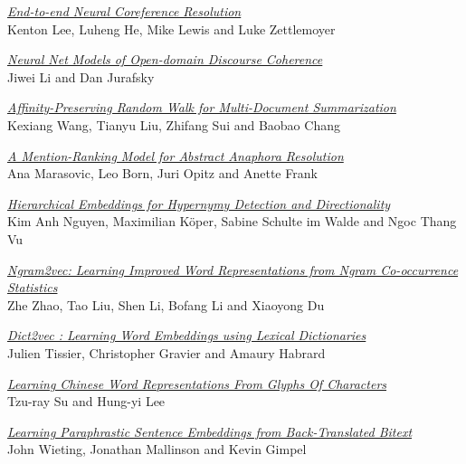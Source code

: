 \hyperlink{page.188}{\em End-to-end Neural Coreference Resolution}\samepage \\
\hspace*{7mm} Kenton Lee, Luheng He, Mike Lewis and Luke Zettlemoyer\dotfill {}

\hyperlink{page.198}{\em Neural Net Models of Open-domain Discourse Coherence}\samepage \\
\hspace*{7mm} Jiwei Li and Dan Jurafsky\dotfill {}

\hyperlink{page.210}{\em Affinity-Preserving Random Walk for Multi-Document Summarization}\samepage \\
\hspace*{7mm} Kexiang Wang, Tianyu Liu, Zhifang Sui and Baobao Chang\dotfill {}

\hyperlink{page.221}{\em A Mention-Ranking Model for Abstract Anaphora Resolution}\samepage \\
\hspace*{7mm} Ana Marasovic, Leo Born, Juri Opitz and Anette Frank\dotfill {}

\hyperlink{page.233}{\em Hierarchical Embeddings for Hypernymy Detection and Directionality}\samepage \\
\hspace*{7mm} Kim Anh Nguyen, Maximilian K\"{o}per, Sabine Schulte im Walde and Ngoc Thang Vu\dotfill {}

\hyperlink{page.244}{\em Ngram2vec: Learning Improved Word Representations from Ngram Co-occurrence Statistics}\samepage \\
\hspace*{7mm} Zhe Zhao, Tao Liu, Shen Li, Bofang Li and Xiaoyong Du\dotfill {}

\hyperlink{page.254}{\em Dict2vec : Learning Word Embeddings using Lexical Dictionaries}\samepage \\
\hspace*{7mm} Julien Tissier, Christopher Gravier and Amaury Habrard\dotfill {}

\hyperlink{page.264}{\em Learning Chinese Word Representations From Glyphs Of Characters}\samepage \\
\hspace*{7mm} Tzu-ray Su and Hung-yi Lee\dotfill {}

\hyperlink{page.274}{\em Learning Paraphrastic Sentence Embeddings from Back-Translated Bitext}\samepage \\
\hspace*{7mm} John Wieting, Jonathan Mallinson and Kevin Gimpel\dotfill {}

